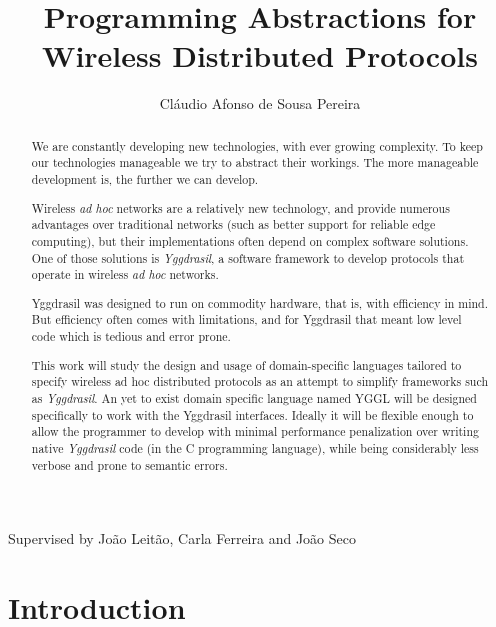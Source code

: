 \documentclass[runningheads]{llncs}
\begin{document}
\title{Programming Abstractions for Wireless Distributed Protocols}
\author{Cláudio Afonso de Sousa Pereira}

\maketitle

\begin{center} Supervised by João Leitão, Carla Ferreira and João Seco \end{center}
\begin{abstract}
We are constantly developing new technologies, with ever growing complexity.
To keep our technologies manageable we try to abstract their workings. The more manageable development is, the further we can develop.
\par Wireless \textit{ad hoc} networks are a relatively new technology, and provide numerous advantages over traditional networks (such as better support for reliable edge computing), but their implementations often depend on complex software solutions. One of those solutions is \textit{Yggdrasil}, a software framework to develop protocols that operate in wireless \textit{ad hoc} networks.
\par Yggdrasil was designed to run on commodity hardware, that is, with efficiency in mind. But efficiency often comes with limitations, and for Yggdrasil that meant low level code which is tedious and error prone.
\par This work will study the design and usage of domain-specific languages tailored to specify wireless ad hoc distributed protocols as an attempt to simplify frameworks such as \textit{Yggdrasil}.
An yet to exist domain specific language named YGGL will be designed specifically to work with the Yggdrasil interfaces.
Ideally it will be flexible enough to allow the programmer to develop with minimal performance penalization over writing native \textit{Yggdrasil} code (in the C programming language), while being considerably less verbose and prone to semantic errors.
\end{abstract}

\section{Introduction}
\end{document}

